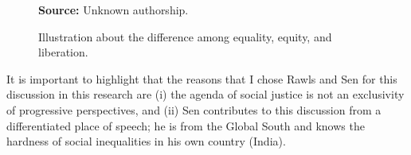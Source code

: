 \begin{figure}[ht!]
\centering

\caption{\textmd{Illustration about the difference among equality, equity, and liberation.}}
\label{fig:rliberation}

\par\medskip\ABNTEXfontereduzida\selectfont\textbf{Source:} Unknown authorship.
\end{figure}

It is important to highlight that the reasons that I chose Rawls and Sen for this discussion in this research are (i) the agenda of social justice is not an exclusivity of progressive perspectives, and (ii) Sen contributes to this discussion from a differentiated place of speech; he is from the Global South and knows the hardness of social inequalities in his own country (India).
